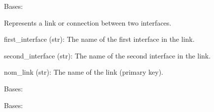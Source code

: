 \documentclass[letterpaper,10pt,english]{sphinxmanual}
\begin{document}

\begin{fulllineitems}
\label{\detokenize{app:app.models.link}}
\pysigstartsignatures
{}
\pysigstopsignatures
\sphinxAtStartPar
Bases: 

\sphinxAtStartPar
Represents a link or connection between two interfaces.
\begin{description}
\sphinxAtStartPar
first\_interface (str): The name of the first interface in the link.

\sphinxAtStartPar
second\_interface (str): The name of the second interface in the link.

\sphinxAtStartPar
nom\_link (str): The name of the link (primary key).

\end{description}

\begin{fulllineitems}
\label{\detokenize{app:app.models.link.DoesNotExist}}
\pysigstartsignatures
{}
\pysigstopsignatures
\sphinxAtStartPar
Bases: 

\end{fulllineitems}


\begin{fulllineitems}
\label{\detokenize{app:app.models.link.MultipleObjectsReturned}}
\pysigstartsignatures
{}
\pysigstopsignatures
\sphinxAtStartPar
Bases: 

\end{fulllineitems}



\end{fulllineitems}
\end{document}
